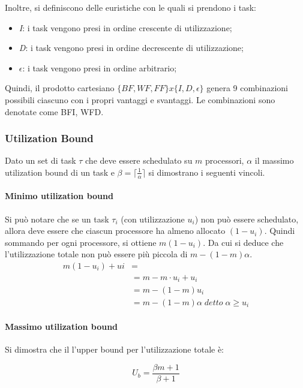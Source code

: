 \documentclass[11pt,a4paper]{report}
\begin{document}
Inoltre, si definiscono delle euristiche con le quali si prendono i task:
\begin{itemize}
    \item \textit{I}: i task vengono presi in ordine crescente di utilizzazione;
    \item \textit{D}: i task vengono presi in ordine decrescente di utilizzazione;
    \item \textit{$\epsilon$}: i task vengono presi in ordine arbitrario;
\end{itemize}

Quindi, il prodotto cartesiano $\{BF , WF , FF\}x\{I, D, \epsilon\}$ genera 9 combinazioni possibili ciascuno con i propri vantaggi e svantaggi. Le combinazioni sono denotate come BFI, WFD.

\subsubsection{Utilization Bound}
Dato un set di task $\tau$ che deve essere schedulato su $m$ processori, $\alpha$ il massimo utilization bound di un task e $\beta = \lceil \frac{1}{\alpha}\rceil$
si dimostrano i seguenti vincoli.

\paragraph{Minimo utilization bound}
Si può notare che se un task $\tau_i$ (con utilizzazione $u_i$) non può essere schedulato, allora deve essere che ciascun processore ha almeno allocato $(1 - u_i)$. Quindi sommando per ogni processore, si ottiene $m(1 - u_i)$. Da cui si deduce che l'utilizzazione totale non può essere più piccola di $m - (1 - m)\alpha$.
\begin{align}
    m(1-u_i) + ui &= \\
    &= m - m \cdot u_i + u_i \\
    &= m - (1 - m)u_i \\
    &= m - (1 - m)\alpha\; detto \;\alpha \geq u_i
\end{align}

\paragraph{Massimo utilization bound}

Si dimostra che il l'upper bound per l'utilizzazione totale è:

\begin{equation}
    U_b = \frac{\beta m + 1}{\beta + 1}
\end{equation}
\end{document}
